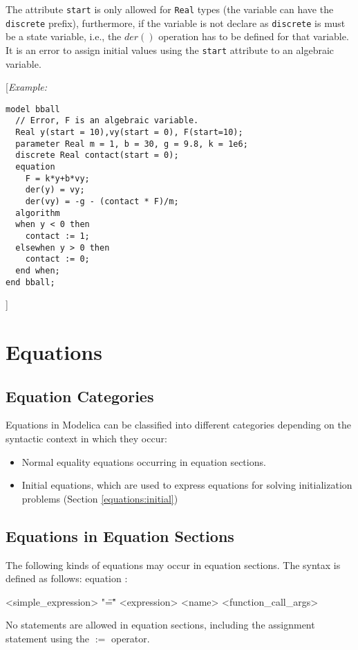 \documentclass[11pt,a4paper,notitlepage]{report}
\begin{document}
The attribute \verb"start" is only allowed for \verb"Real" types (the variable can have the \verb"discrete" prefix), furthermore, if the variable is not declare as \verb"discrete" is must be a state variable, i.e., the $der()$ operation has to be defined for that variable. It is an error to assign initial values using the \verb"start" attribute to an algebraic variable.

[\emph{Example:}
\begin{verbatim}
model bball
  // Error, F is an algebraic variable.  
  Real y(start = 10),vy(start = 0), F(start=10);
  parameter Real m = 1, b = 30, g = 9.8, k = 1e6;
  discrete Real contact(start = 0); 
  equation
    F = k*y+b*vy;
    der(y) = vy;
    der(vy) = -g - (contact * F)/m;
  algorithm 
  when y < 0 then
    contact := 1;
  elsewhen y > 0 then
    contact := 0;
  end when;
end bball;
\end{verbatim}]

\chapter{Equations}\label{ch:equations}

\section{Equation Categories}

Equations in Modelica can be classified into different categories depending on the syntactic context in which they occur:
\begin{itemize}
\item Normal equality equations occurring in equation sections.
\item Initial equations, which are used to express equations for solving initialization problems (Section \ref{equations:initial})  
\end{itemize}

\section{Equations in Equation Sections}

The following kinds of equations may occur in equation sections. The syntax is defined as follows:
equation :
\begin{grammar}
<simple_expression> "\"=\"" <expression>
\alt <name> <function_call_args> 
\end{grammar}

No statements are allowed in equation sections, including the assignment statement using the $:=$ operator.
\end{document}
